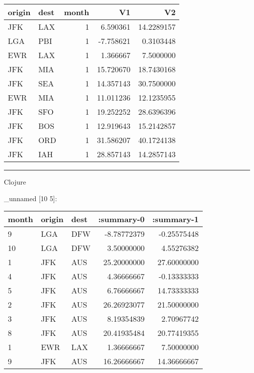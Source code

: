 \documentclass[]{article}
\newenvironment{Shaded}{\begin{snugshade}}{\end{snugshade}}
\newcommand{\KeywordTok}[1]{\textcolor[rgb]{0.13,0.29,0.53}{\textbf{#1}}}
\newcommand{\DecValTok}[1]{\textcolor[rgb]{0.00,0.00,0.81}{#1}}
\newcommand{\StringTok}[1]{\textcolor[rgb]{0.31,0.60,0.02}{#1}}
\newcommand{\VariableTok}[1]{\textcolor[rgb]{0.00,0.00,0.00}{#1}}
\newcommand{\NormalTok}[1]{#1}
\begin{document}
\begin{longtable}[]{@{}llrrr@{}}
\toprule
origin & dest & month & V1 & V2\tabularnewline
\midrule
\endhead
JFK & LAX & 1 & 6.590361 & 14.2289157\tabularnewline
LGA & PBI & 1 & -7.758621 & 0.3103448\tabularnewline
EWR & LAX & 1 & 1.366667 & 7.5000000\tabularnewline
JFK & MIA & 1 & 15.720670 & 18.7430168\tabularnewline
JFK & SEA & 1 & 14.357143 & 30.7500000\tabularnewline
EWR & MIA & 1 & 11.011236 & 12.1235955\tabularnewline
JFK & SFO & 1 & 19.252252 & 28.6396396\tabularnewline
JFK & BOS & 1 & 12.919643 & 15.2142857\tabularnewline
JFK & ORD & 1 & 31.586207 & 40.1724138\tabularnewline
JFK & IAH & 1 & 28.857143 & 14.2857143\tabularnewline
\bottomrule
\end{longtable}

\begin{center}\rule{0.5\linewidth}{0.5pt}\end{center}

Clojure

\begin{Shaded}
\end{Shaded}

\_unnamed {[}10 5{]}:

\begin{longtable}[]{@{}lllrr@{}}
\toprule
month & origin & dest & :summary-0 & :summary-1\tabularnewline
\midrule
\endhead
9 & LGA & DFW & -8.78772379 & -0.25575448\tabularnewline
10 & LGA & DFW & 3.50000000 & 4.55276382\tabularnewline
1 & JFK & AUS & 25.20000000 & 27.60000000\tabularnewline
4 & JFK & AUS & 4.36666667 & -0.13333333\tabularnewline
5 & JFK & AUS & 6.76666667 & 14.73333333\tabularnewline
2 & JFK & AUS & 26.26923077 & 21.50000000\tabularnewline
3 & JFK & AUS & 8.19354839 & 2.70967742\tabularnewline
8 & JFK & AUS & 20.41935484 & 20.77419355\tabularnewline
1 & EWR & LAX & 1.36666667 & 7.50000000\tabularnewline
9 & JFK & AUS & 16.26666667 & 14.36666667\tabularnewline
\bottomrule
\end{longtable}
\end{document}
